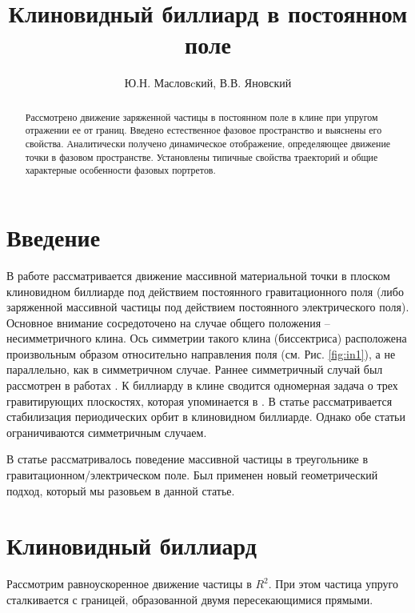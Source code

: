 \documentclass[a4paper]{article}
\title{Клиновидный биллиард в постоянном поле}
\author{Ю.Н. Масловcкий, В.В. Яновский}
\begin{document}
\maketitle

\begin{abstract}
Рассмотрено движение заряженной частицы в постоянном поле в клине при упругом отражении ее от границ. Введено естественное фазовое пространство и выяснены его свойства. Аналитически получено динамическое отображение, определяющее движение точки в фазовом пространстве. Установлены типичные свойства траекторий и общие характерные особенности фазовых портретов.
\end{abstract}

\section{Введение}

В работе рассматривается движение массивной материальной точки в плоском клиновидном биллиарде под действием постоянного гравитационного поля (либо заряженной массивной частицы под действием постоянного электрического поля). Основное внимание сосредоточено на случае общего положения -- несимметричного клина. Ось симметрии такого клина (биссектриса) расположена произвольным образом относительно направления поля (см. Рис. \ref{fig:in1}), а не параллельно, как в симметричном случае.  Раннее симметричный случай был рассмотрен в работах \cite{Lehtihet1986,Sepulchre2003}.  К биллиарду в клине сводится одномерная задача о трех гравитирующих  плоскостях, которая упоминается в \cite{Lehtihet1986}. В статье \cite{Sepulchre2003} рассматривается стабилизация периодических орбит в клиновидном биллиарде.  Однако обе статьи ограничиваются симметричным случаем.

В статье \cite{Yanovskii2013}  рассматривалось поведение массивной частицы в треугольнике в гравитационном/электрическом поле. Был применен новый геометрический подход, который мы разовьем в данной статье.


\section{ Клиновидный биллиард }

Рассмотрим равноускоренное движение частицы в $R^{2} $. При этом частица упруго сталкивается с границей, образованной двумя пересекающимися прямыми.
\end{document}
